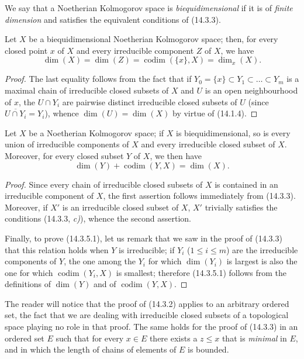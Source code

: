 We say that a Noetherian Kolmogorov space is \emph{biequidimensional}
if it is of \emph{finite dimension} and satisfies the equivalent conditions
of (14.3.3).

\begin{corollary}[14.3.4]
\label{0.14.3.4}
Let $X$ be a biequidimensional Noetherian Kolmogorov space; then, for
every closed point $x$ of $X$ and every irreducible component $Z$ of $X$, we have
\[
  \dim(X)=\dim(Z)=\operatorname{codim}(\{x\},X)=\dim_x(X).
  \tag{14.3.4.1}\label{0.14.3.4.1}
\]
\end{corollary}

\begin{proof}
The last equality follows from the fact that if
$Y_0=\{x\}\subset Y_1\subset\ldots\subset Y_m$ is a maximal chain of
irreducible closed subsets of $X$ and $U$ is an open neighbourhood of $x$, the
$U\cap Y_i$ are pairwise distinct irreducible closed subsets of $U$
(since $\overline{U\cap Y_i}=Y_i$), whence
$\dim(U)=\dim(X)$ by virtue of (14.1.4).
\end{proof}

\begin{corollary}[14.3.5]
\label{0.14.3.5}
Let $X$ be a Noetherian Kolmogorov space; if $X$ is
biequidimensional, so is every union of irreducible
components of $X$ and every irreducible closed subset of $X$. Moreover,
for every closed subset $Y$ of $X$, we then have
\[
  \dim(Y)+\operatorname{codim}(Y,X)=\dim(X).
  \tag{14.3.5.1}\label{0.14.3.5.1}
\]
\end{corollary}

\begin{proof}
Since every chain of irreducible closed subsets of $X$ is contained in an
irreducible component of $X$, the first assertion follows immediately from
(14.3.3). Moreover, if $X'$ is an irreducible closed subset of $X$, $X'$
trivially satisfies the conditions (14.3.3, \emph{c)}), whence the second assertion.

Finally, to prove (14.3.5.1), let us remark that we saw in the
proof of (14.3.3) that this relation holds when $Y$ is
irreducible; if $Y_i$ ($1\leq i\leq m$) are the irreducible components
of $Y$, the one among the $Y_i$ for which $\dim(Y_i)$ is largest is also
the one for which $\operatorname{codim}(Y_i,X)$ is smallest; therefore
(14.3.5.1) follows from the definitions of $\dim(Y)$ and of
$\operatorname{codim}(Y,X)$.
\end{proof}

\begin{remark}[14.3.6]
\label{0.14.3.6}
The reader will notice that the proof of (14.3.2) applies to an
arbitrary ordered set, the fact that we are dealing with irreducible closed
subsets of a topological space playing no role in that
proof. The same holds for the proof of (14.3.3) in an
ordered set $E$ such that for every $x\in E$ there exists a $z\leq x$ that
is \emph{minimal} in $E$, and in which the length of chains of elements of $E$
is bounded.
\end{remark}
